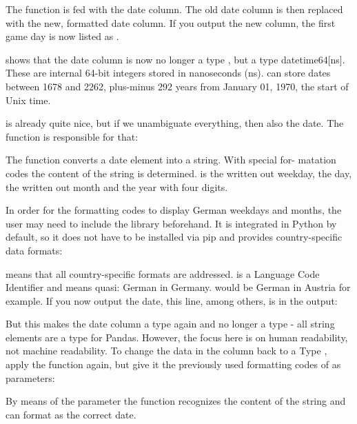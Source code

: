 
The function  is fed with the date column. The old date column is then replaced with the new, formatted date column. If you output the new column, the first game day is now listed as . 

 shows that the date column is now no longer a type , but a type datetime64[ns]. These are internal 64-bit integers stored in nanoseconds (ns).  can store dates between 1678 and 2262, plus-minus 292 years from January 01, 1970, the start of Unix time.

 is already quite nice, but if we unambiguate everything, then also the date. The function  is responsible for that:


The function converts a date element into a string. With special for- matation codes
 the content of the string is determined. is the written out weekday,  the day,  the written out month and  the year with four digits.

In order for the formatting codes to display German weekdays and months, the user may need to include the  library beforehand. It is integrated in Python by default, so it does not have to be installed via pip and provides country-specific data formats:


 means that all country-specific formats are addressed.  is a Language Code Identifier and means quasi: German in Germany.  would be German in Austria for example.
If you now output the date, this line, among others, is in the output:


But this makes the date column a type  again and no longer a type 
- all string elements are a type  for Pandas. However, the focus here is on human readability, not machine readability. To change the data in the column back to a Type , apply the function  again, but give it the previously used formatting codes of  as parameters:


By means of the parameter   the function recognizes the content of the string and can format as the correct date.

















